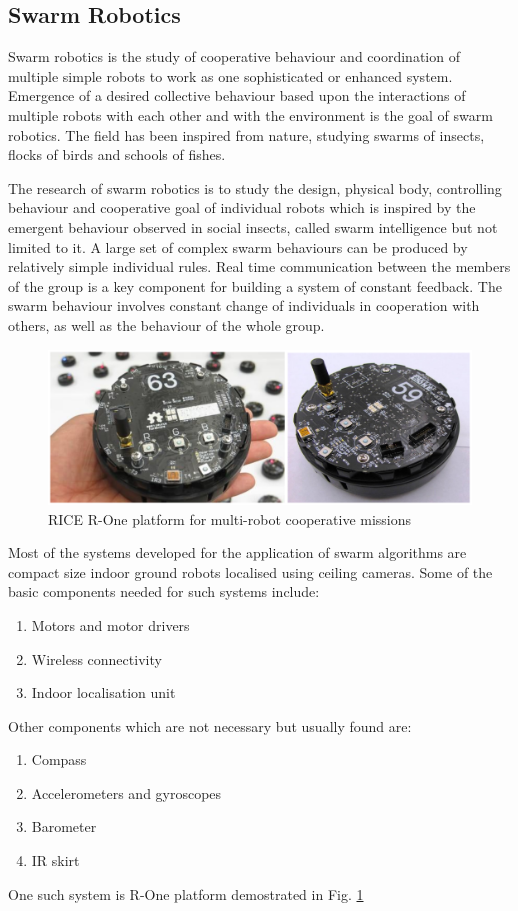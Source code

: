 \begin{spacing}{2}
\section{Swarm Robotics}
Swarm robotics is the study of cooperative behaviour and coordination of multiple simple robots to work as one sophisticated or enhanced system. Emergence of a desired collective behaviour based upon the interactions of multiple robots with each other and with the environment is the goal of swarm robotics. The field has been inspired from nature, studying swarms of insects, flocks of birds and schools of fishes.

The research of swarm robotics is to study the design, physical body, controlling behaviour and cooperative goal of individual robots which is inspired by the emergent behaviour observed in social insects, called swarm intelligence but not limited to it. A large set of complex swarm behaviours can be produced by relatively simple individual rules. Real time communication between the members of the group is a key component for building a system of constant feedback. The swarm behaviour involves constant change of individuals in cooperation with others, as well as the behaviour of the whole group.

\begin{figure}
    \centering
    \includegraphics[width = \linewidth]{image/rone.png}
    \caption[Caption for LOF]{RICE R-One platform for multi-robot cooperative missions \protect\footnotemark}
    \label{fig:rone}
\end{figure}

Most of the systems developed for the application of swarm algorithms are compact size indoor ground robots localised using ceiling cameras. Some of the basic components needed for such systems include:
\begin{enumerate}
    \item Motors and motor drivers
    \item Wireless connectivity
    \item Indoor localisation unit
\end{enumerate}
Other components which are not necessary but usually found are:
\begin{enumerate}
    \item Compass
    \item Accelerometers and gyroscopes
    \item Barometer
    \item IR skirt
\end{enumerate}
One such system is R-One platform demostrated in Fig. \ref{fig:rone}


\end{spacing}
